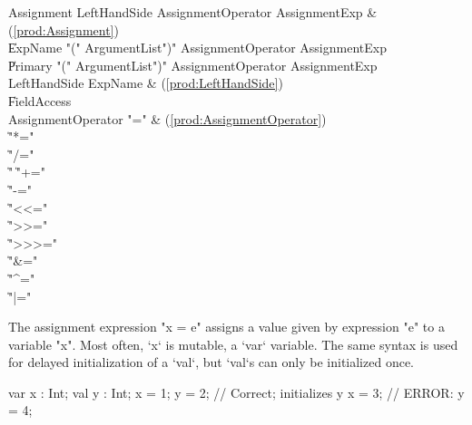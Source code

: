 \begin{bbgrammar}
          Assignment \: LeftHandSide AssignmentOperator AssignmentExp & (\ref{prod:Assignment}) \\
                    \| ExpName  \xcd"(" ArgumentList\opt \xcd")" AssignmentOperator AssignmentExp \\
                    \| Primary  \xcd"(" ArgumentList\opt \xcd")" AssignmentOperator AssignmentExp \\
        LeftHandSide \: ExpName & (\ref{prod:LeftHandSide}) \\
                    \| FieldAccess \\
  AssignmentOperator \: \xcd"=" & (\ref{prod:AssignmentOperator}) \\
                    \| \xcd"*=" \\
                    \| \xcd"/=" \\
                    \| \xcd"%
                    \| \xcd"+=" \\
                    \| \xcd"-=" \\
                    \| \xcd"<<=" \\
                    \| \xcd">>=" \\
                    \| \xcd">>>=" \\
                    \| \xcd"&=" \\
                    \| \xcd"^=" \\
                    \| \xcd"|=" \\
\end{bbgrammar}



The assignment expression \xcd"x = e" assigns a value given by
expression \xcd"e"
to a variable \xcd"x".  
Most often, \xcd`x` is mutable, a \xcd`var` variable.  The same syntax is
used for delayed initialization of a \xcd`val`, but \xcd`val`s can only be
initialized once.
\begin{xten}
  var x : Int;
  val y : Int;
  x = 1;
  y = 2; // Correct; initializes y
  x = 3; 
  // ERROR: y = 4;
\end{xten}


